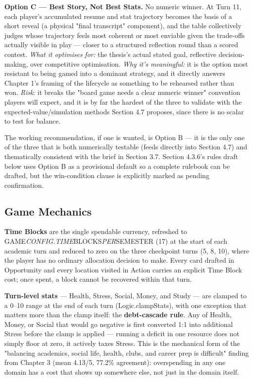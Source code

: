 \textbf{Option C --- Best Story, Not Best Stats.} No numeric winner. At Turn 11, each player's accumulated resume and stat trajectory becomes the basis of a short reveal (a physical "final transcript" component), and the table collectively judges whose trajectory feels most coherent or most enviable given the trade-offs actually visible in play --- closer to a structured reflection round than a scored contest. \emph{What it optimises for:} the thesis's actual stated goal, reflective decision-making, over competitive optimisation. \emph{Why it's meaningful:} it is the option most resistant to being gamed into a dominant strategy, and it directly answers Chapter 1's framing of the lifecycle as something to be rehearsed rather than won. \emph{Risk:} it breaks the "board game needs a clear numeric winner" convention players will expect, and it is by far the hardest of the three to validate with the expected-value/simulation methods Section 4.7 proposes, since there is no scalar to test for balance.

The working recommendation, if one is wanted, is Option B --- it is the only one of the three that is both numerically testable (feeds directly into Section 4.7) and thematically consistent with the brief in Section 3.7. Section 4.3.6's rules draft below uses Option B as a provisional default so a complete rulebook can be drafted, but the win-condition clause is explicitly marked as pending confirmation.

\subsection{Game Mechanics}

\textbf{Time Blocks} are the single spendable currency, refreshed to GAME\emph{CONFIG.TIME}BLOCKS\emph{PER}SEMESTER (17) at the start of each academic turn and reduced to zero on the three checkpoint turns (5, 8, 10), where the player has no ordinary allocation decision to make. Every card drafted in Opportunity and every location visited in Action carries an explicit Time Block cost; once spent, a block cannot be recovered within that turn.

\textbf{Turn-level stats} --- Health, Stress, Social, Money, and Study --- are clamped to a 0--10 range at the end of each turn (Logic.clampStats), with one exception that matters more than the clamp itself: the \textbf{debt-cascade rule}. Any of Health, Money, or Social that would go negative is first converted 1:1 into additional Stress before the clamp is applied --- running a deficit in one resource does not simply floor at zero, it actively taxes Stress. This is the mechanical form of the "balancing academics, social life, health, clubs, and career prep is difficult" finding from Chapter 3 (mean 4.13/5, 77.2\% agreement): overspending in any one domain has a cost that shows up somewhere else, not just in the domain itself.

